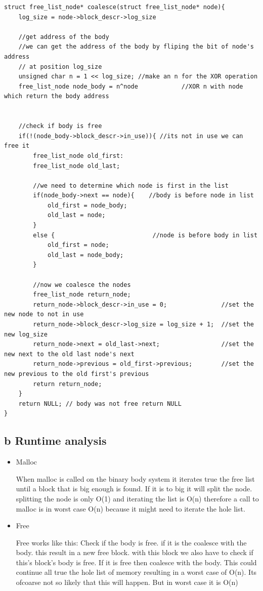 \documentclass[a4paper,12pt,danish]{report}
\begin{document}
\begin{verbatim}
struct free_list_node* coalesce(struct free_list_node* node){
    log_size = node->block_descr->log_size

    //get address of the body
    //we can get the address of the body by fliping the bit of node's address
    // at position log_size
    unsigned char n = 1 << log_size; //make an n for the XOR operation
    free_list_node node_body = n^node            //XOR n with node which return the body address


    //check if body is free
    if(!(node_body->block_descr->in_use)){ //its not in use we can free it
        free_list_node old_first:
        free_list_node old_last;

        //we need to determine which node is first in the list
        if(node_body->next == node){    //body is before node in list
            old_first = node_body;
            old_last = node;
        }
        else {                           //node is before body in list
            old_first = node;
            old_last = node_body;
        }

        //now we coalesce the nodes
        free_list_node return_node;
        return_node->block_descr->in_use = 0;               //set the new node to not in use
        return_node->block_descr->log_size = log_size + 1;  //set the new log_size
        return_node->next = old_last->next;                 //set the new next to the old last node's next
        return_node->previous = old_first->previous;        //set the new previous to the old first's previous
        return return_node;
    }
    return NULL; // body was not free return NULL
}
\end{verbatim}

\subsection{b Runtime analysis}
\begin{itemize}
  \item Malloc

When malloc is called on the binary body system it iterates true the free list
until a block that is big enough is found. If it is to big it will split the
node. splitting the node is only O(1) and iterating the list is O(n) therefore
a call to malloc is in worst case O(n) because it might need to iterate the hole
list.

\item Free

Free works like this:
Check if the body is free. if it is the coalesce with the body.
this result in a new free block. with this block we also have to check if this's
block's body is free. If it is free then coalesce with the body. This could
continue all true the hole list of memory resulting in a worst case of O(n).
Its ofcoarse not so likely that this will happen. But in worst case it is O(n)
\end{itemize}
\end{document}
